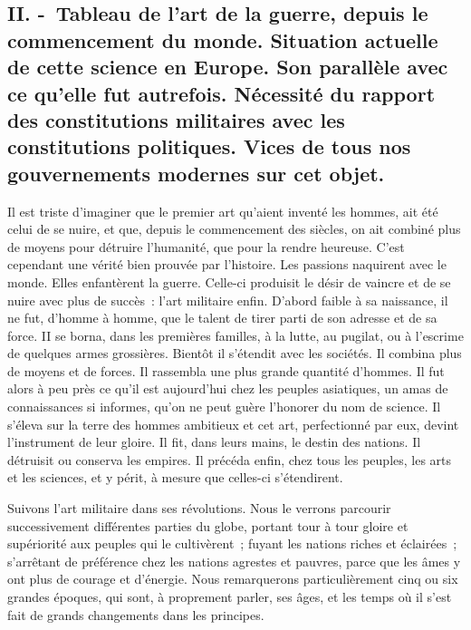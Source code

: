 \documentclass[french,twoside]{book} %
\begin{document}
\subsection[{II. - Tableau de l’art de la guerre, depuis le commencement du monde. Situation actuelle de cette science en Europe. Son parallèle avec ce qu’elle fut autrefois. Nécessité du rapport des constitutions militaires avec les constitutions politiques. Vices de tous nos gouvernements modernes sur cet objet.}]{II. - Tableau de l’art de la guerre, depuis le commencement du monde. Situation actuelle de cette science en Europe. Son parallèle avec ce qu’elle fut autrefois. Nécessité du rapport des constitutions militaires avec les constitutions politiques. Vices de tous nos gouvernements modernes sur cet objet.}
\noindent Il est triste d’imaginer que le premier art qu’aient inventé les hommes, ait été celui de se nuire, et que, depuis le commencement des siècles, on ait combiné plus de moyens pour détruire l’humanité, que pour la rendre heureuse. C’est cependant une vérité bien prouvée par l’histoire. Les passions naquirent avec le monde. Elles enfantèrent la guerre. Celle-ci produisit le désir de vaincre et de se nuire avec plus de succès : l’art militaire enfin. D’abord faible à sa naissance, il ne fut, d’homme à homme, que le talent de tirer parti de son adresse et de sa force. II se borna, dans les premières familles, à la lutte, au pugilat, ou à l’escrime de quelques armes grossières. Bientôt il s’étendit avec les sociétés. Il combina plus de moyens et de forces. Il rassembla une plus grande quantité d’hommes. Il fut alors à peu près ce qu’il est aujourd’hui chez les peuples asiatiques, un amas de connaissances si informes, qu’on ne peut guère l’honorer du nom de science. Il s’éleva sur la terre des hommes ambitieux et cet art, perfectionné par eux, devint l’instrument de leur gloire. Il fit, dans leurs mains, le destin des nations. Il détruisit ou conserva les empires. Il précéda enfin, chez tous les peuples, les arts et les sciences, et y périt, à mesure que celles-ci s’étendirent.\par
Suivons l’art militaire dans ses révolutions. Nous le verrons parcourir successivement différentes parties du globe, portant tour à tour gloire et supériorité aux peuples qui le cultivèrent ; fuyant les nations riches et éclairées ; s’arrêtant de préférence chez les nations agrestes et pauvres, parce que les âmes y ont plus de courage et d’énergie. Nous remarquerons particulièrement cinq ou six grandes époques, qui sont, à proprement parler, ses âges, et les temps où il s’est fait de grands changements dans les principes.\par
\end{document}
